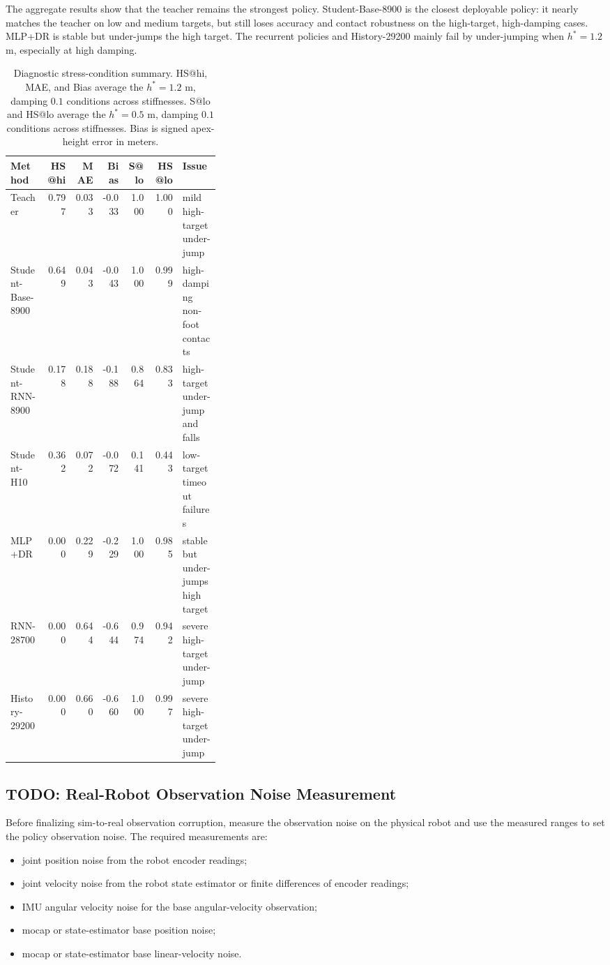 \documentclass[11pt, a4paper]{article}
\begin{document}
The aggregate results show that the teacher remains the strongest policy.
Student-Base-8900 is the closest deployable policy: it nearly matches the
teacher on low and medium targets, but still loses accuracy and contact
robustness on the high-target, high-damping cases. MLP+DR is stable but
under-jumps the high target. The recurrent policies and History-29200 mainly
fail by under-jumping when $h^*=1.2$ m, especially at high damping.

\begin{table}[h]
\centering
\scriptsize
\setlength{\tabcolsep}{3pt}
\begin{tabular}{p{0.17\linewidth}rrrrrp{0.18\linewidth}}
\hline
Method &
HS@hi &
MAE &
Bias &
S@lo &
HS@lo &
Issue \\
\hline
Teacher & 0.797 & 0.033 & -0.033 & 1.000 & 1.000 & mild high-target under-jump \\
Student-Base-8900 & 0.649 & 0.043 & -0.043 & 1.000 & 0.999 & high-damping non-foot contacts \\
Student-RNN-8900 & 0.178 & 0.188 & -0.188 & 0.864 & 0.833 & high-target under-jump and falls \\
Student-H10 & 0.362 & 0.072 & -0.072 & 0.141 & 0.443 & low-target timeout failures \\
MLP+DR & 0.000 & 0.229 & -0.229 & 1.000 & 0.985 & stable but under-jumps high target \\
RNN-28700 & 0.000 & 0.644 & -0.644 & 0.974 & 0.942 & severe high-target under-jump \\
History-29200 & 0.000 & 0.660 & -0.660 & 1.000 & 0.997 & severe high-target under-jump \\
\hline
\end{tabular}
\caption{Diagnostic stress-condition summary. HS@hi, MAE, and Bias average the
$h^*=1.2$ m, damping $0.1$ conditions across stiffnesses. S@lo and HS@lo average
the $h^*=0.5$ m, damping $0.1$ conditions across stiffnesses. Bias is signed
apex-height error in meters.}
\label{tab:rebounce-current-selected}
\end{table}

\subsection{TODO: Real-Robot Observation Noise Measurement}

Before finalizing sim-to-real observation corruption, measure the observation
noise on the physical robot and use the measured ranges to set the policy
observation noise. The required measurements are:
\begin{itemize}
    \item joint position noise from the robot encoder readings;
    \item joint velocity noise from the robot state estimator or finite
    differences of encoder readings;
    \item IMU angular velocity noise for the base angular-velocity observation;
    \item mocap or state-estimator base position noise;
    \item mocap or state-estimator base linear-velocity noise.
\end{itemize}
\end{document}
